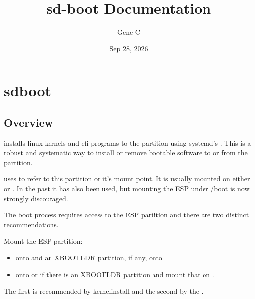\documentclass[letterpaper,11pt,english]{sphinxmanual}
\title{sd-boot Documentation }
\date{Sep 28, 2026}
\author{Gene C}
\begin{document}
\pagestyle{empty}
\sphinxmaketitle
\pagestyle{plain}
\sphinxtableofcontents
\pagestyle{normal}
\label{\detokenize{index::doc}}


\sphinxstepscope


\chapter{sd\sphinxhyphen{}boot}
\label{\detokenize{Readme:sd-boot}}\label{\detokenize{Readme:read-me}}\label{\detokenize{Readme::doc}}

\section{Overview}
\label{\detokenize{Readme:overview}}
\sphinxAtStartPar
{} installs linux kernels and efi programs to the  partition using systemd’s .
This is a robust and systematic way to install or remove bootable software to or
from the  partition.

\sphinxAtStartPar
{} uses  to refer to this partition or it’s mount point.
It is usually mounted on either  or .
In the past it  has also been used, but mounting the ESP under /boot is now strongly discouraged.

\sphinxAtStartPar
The boot process requires access to the ESP partition
and there are two distinct recommendations.

\sphinxAtStartPar
Mount the ESP partition:
\begin{itemize}
\item {} 
\sphinxAtStartPar
onto  and an XBOOTLDR partition, if any, onto 

\item {} 
\sphinxAtStartPar
onto  or  if there is an XBOOTLDR partition and mount that on .

\end{itemize}

\sphinxAtStartPar
The first is recommended by kernel\sphinxhyphen{}install and the second by the
.
\end{document}
